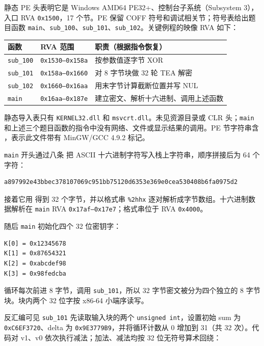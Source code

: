 静态 PE 头表明它是 Windows AMD64 PE32+、控制台子系统（Subsystem 3），入口 RVA \texttt{0x1500}，17 个节。PE 保留 COFF 符号和调试相关节；符号表给出题目函数 \texttt{main}、\texttt{sub\_100}、\texttt{sub\_101}、\texttt{sub\_102}。关键例程的映像 RVA 如下：

{\def\LTcaptype{} %
\begin{longtable}[]{@{}lll@{}}
\toprule\noalign{}
函数 & RVA 范围 & 职责（根据指令恢复） \\
\midrule\noalign{}
\endhead
\bottomrule\noalign{}
\endlastfoot
\texttt{sub\_100} & \texttt{0x1530–0x158a} & 按参数值逐字节 XOR \\
\texttt{sub\_101} & \texttt{0x158a–0x1660} & 对 8 字节块做 32 轮 TEA 解密 \\
\texttt{sub\_102} & \texttt{0x1660–0x16aa} & 用末字节计算截断位置并写 NUL \\
\texttt{main} & \texttt{0x16aa–0x187e} & 建立密文、解析十六进制、调用上述函数 \\
\end{longtable}
}

静态导入表只有 \texttt{KERNEL32.dll} 和 \texttt{msvcrt.dll}。未见资源目录或 CLR 头；\texttt{main} 和上述三个题目函数的指令中没有网络、文件或显示结果的调用。PE 节字符串含 \texttt{}，表示此文件带有 MinGW/GCC 4.9.2 标记。

\texttt{main} 开头通过八条 \texttt{} 把 ASCII 十六进制字符写入栈上字符串，顺序拼接后为 64 个字符：

\begin{verbatim}
a897992e43bbec378107069c951bb75120d6353e369e0cea530408b6fa0975d2
\end{verbatim}

接着它用 \texttt{} 得到 32 个字节，并以格式串 \texttt{\%2hhx} 逐对解析成字节数组。十六进制数据解析在 \texttt{main} RVA \texttt{0x17af–0x17e7}；格式串位于 RVA \texttt{0x4000}。

随后 \texttt{main} 初始化四个 32 位密钥字：

\begin{verbatim}
K[0] = 0x12345678
K[1] = 0x87654321
K[2] = 0xabcdef98
K[3] = 0x98fedcba
\end{verbatim}

循环每次前进 8 字节，调用 \texttt{sub\_101}，所以 32 字节密文被分为四个独立的 8 字节块。块内两个 32 位字按 x86-64 小端序读写。

反汇编可见 \texttt{sub\_101} 先读取输入块的两个 \texttt{unsigned\ int}，设置初始 sum 为 \texttt{0xC6EF3720}、delta 为 \texttt{0x9E3779B9}，并将循环计数从 0 增加到 31（共 32 次）。代码对 v1、v0 依次执行减法；加法、减法均按 32 位无符号算术回绕：

